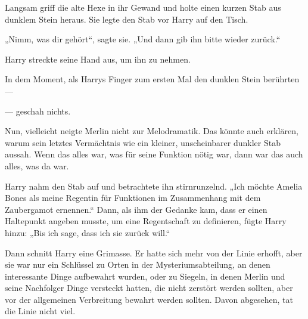 Langsam griff die alte Hexe in ihr Gewand und holte einen kurzen Stab aus dunklem Stein heraus. Sie legte den Stab vor Harry auf den Tisch.

„Nimm, was dir gehört“, sagte sie.
„Und dann gib ihn bitte wieder zurück.“

Harry streckte seine Hand aus, um ihn zu nehmen.

In dem Moment, als Harrys Finger zum ersten Mal den dunklen Stein berührten —

— geschah nichts.

Nun, vielleicht neigte Merlin nicht zur Melodramatik. Das könnte auch erklären, warum sein letztes Vermächtnis wie ein kleiner, unscheinbarer dunkler Stab aussah. Wenn das alles war, was für seine Funktion nötig war, dann war das auch alles, was da war.

Harry nahm den Stab auf und betrachtete ihn stirnrunzelnd.
„Ich möchte Amelia Bones als meine Regentin für Funktionen im Zusammenhang mit dem Zaubergamot ernennen.“ Dann, als ihm der Gedanke kam, dass er einen Haltepunkt angeben musste, um eine Regentschaft zu definieren, fügte Harry hinzu:
„Bis ich sage, dass ich sie zurück will.“

Dann schnitt Harry eine Grimasse. Er hatte sich mehr von der Linie erhofft, aber sie war nur ein Schlüssel zu Orten in der Mysteriumsabteilung, an denen interessante Dinge aufbewahrt wurden, oder zu Siegeln, in denen Merlin und seine Nachfolger Dinge versteckt hatten, die nicht zerstört werden sollten, aber vor der allgemeinen Verbreitung bewahrt werden sollten. Davon abgesehen, tat die Linie nicht viel.

